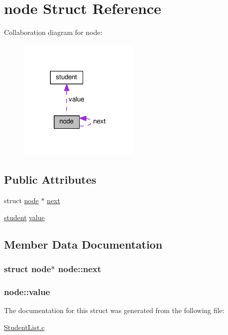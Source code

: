 \hypertarget{structnode}{}\section{node Struct Reference}
\label{structnode}


Collaboration diagram for node\+:
\nopagebreak
\begin{figure}[H]
\begin{center}
\leavevmode
\includegraphics[width=164pt]{structnode__coll__graph}
\end{center}
\end{figure}
\subsection*{Public Attributes}
\begin{DoxyCompactItemize}
\item 
struct \hyperlink{structnode}{node} $\ast$ \hyperlink{structnode_aa3e8aa83f864292b5a01210f4453fcc0}{next}
\item 
\hyperlink{structstudent}{student} \hyperlink{structnode_ad09f1b9b9f1b7a5a29fc2b9422dd85fe}{value}
\end{DoxyCompactItemize}


\subsection{Member Data Documentation}
\subsubsection[{\texorpdfstring{next}{next}}]{\setlength{\rightskip}{0pt plus 5cm}struct {\bf node}$\ast$ node\+::next}\hypertarget{structnode_aa3e8aa83f864292b5a01210f4453fcc0}{}\label{structnode_aa3e8aa83f864292b5a01210f4453fcc0}
\subsubsection[{\texorpdfstring{value}{value}}]{ node\+::value}\hypertarget{structnode_ad09f1b9b9f1b7a5a29fc2b9422dd85fe}{}\label{structnode_ad09f1b9b9f1b7a5a29fc2b9422dd85fe}


The documentation for this struct was generated from the following file\+:\begin{DoxyCompactItemize}
\item 
\hyperlink{StudentList_8c}{Student\+List.\+c}\end{DoxyCompactItemize}
